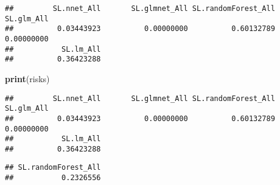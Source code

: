 \documentclass[
]{article}
\newenvironment{Shaded}{\begin{snugshade}}{\end{snugshade}}
\newcommand{\CommentTok}[1]{\textcolor[rgb]{0.56,0.35,0.01}{\textit{#1}}}
\newcommand{\FunctionTok}[1]{\textcolor[rgb]{0.13,0.29,0.53}{\textbf{#1}}}
\newcommand{\NormalTok}[1]{#1}
\newcommand{\OtherTok}[1]{\textcolor[rgb]{0.56,0.35,0.01}{#1}}
\newcommand{\SpecialCharTok}[1]{\textcolor[rgb]{0.81,0.36,0.00}{\textbf{#1}}}
\begin{document}
\begin{Shaded}
\end{Shaded}

\begin{verbatim}
##         SL.nnet_All       SL.glmnet_All SL.randomForest_All          SL.glm_All 
##          0.03443923          0.00000000          0.60132789          0.00000000 
##           SL.lm_All 
##          0.36423288
\end{verbatim}

\begin{Shaded}
\begin{Highlighting}[]
\FunctionTok{print}\NormalTok{(risks)}
\end{Highlighting}
\end{Shaded}

\begin{verbatim}
##         SL.nnet_All       SL.glmnet_All SL.randomForest_All          SL.glm_All 
##          0.03443923          0.00000000          0.60132789          0.00000000 
##           SL.lm_All 
##          0.36423288
\end{verbatim}

\begin{Shaded}
\end{Shaded}

\begin{verbatim}
## SL.randomForest_All 
##           0.2326556
\end{verbatim}

\begin{Shaded}
\end{Shaded}
\end{document}
